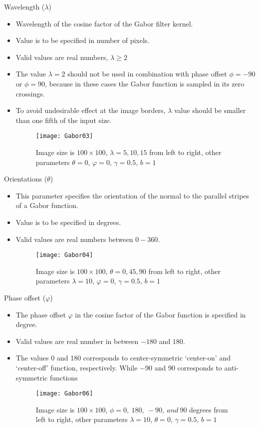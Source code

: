 \begin{frame}{Wavelength ($\lambda$)}
\begin{itemize}
\item Wavelength of the cosine factor of the Gabor filter kernel.
\item Value is to be specified in number of pixels.
\item Valid values are real numbers, $\lambda\geq 2$
\item The value $\lambda=2$ should not be used in combination with phase offset $\phi = -90$ or $\phi=90$, because in these cases the Gabor function is sampled in its zero crossings.
\item To avoid undesirable effect at the image borders, $\lambda$ value should be smaller than one fifth of the input size.
\begin{figure}
\texttt{[image: Gabor03]}
\caption{Image size is $100\times 100$, $\lambda=5,10,15$ from left to right, other parameters $\theta = 0$, $\varphi = 0$, $\gamma=0.5$, $b = 1$}
\end{figure}
\end{itemize}
\end{frame}

\begin{frame}{Orientations ($\theta$)}
\begin{itemize}
\item This parameter specifies the orientation of the normal to the parallel stripes of a Gabor function.
\item Value is to be specified in degrees.
\item Valid values are real numbers between $0-360$.
\begin{figure}
\texttt{[image: Gabor04]}
\caption{Image size is $100\times 100$, $\theta=0,45,90$ from left to right, other parameters $\lambda = 10$, $\varphi= 0$, $\gamma=0.5$, $b = 1$}
\end{figure}
\end{itemize}
\end{frame}

\begin{frame}{Phase offset ($\varphi$)}
\begin{itemize}
\item The phase offset $\varphi$ in the cosine factor of the Gabor function is specified in degree.
\item Valid values are real number in between $-180$ and $180$.
\item The values 0 and 180 corresponds to center-symmetric `center-on' and `center-off' function, respectively. While $-90$ and $90$ corresponds to anti-symmetric functions
\begin{figure}
\texttt{[image: Gabor06]}
\caption{Image size is $100\times 100$, $\phi=0,~180,~-90,~and~90$ degrees from left to right, other parameters $\lambda = 10$, $\theta = 0$, $\gamma=0.5$, $b = 1$}
\end{figure}
\end{itemize}
\end{frame}

